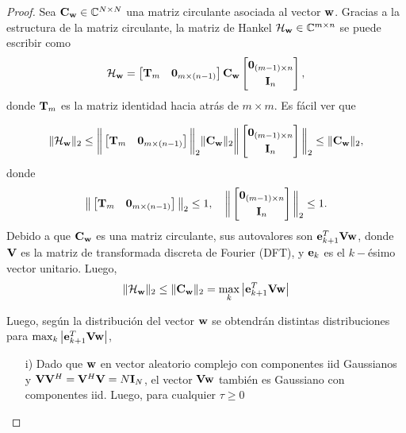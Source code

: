	\begin{proof}  Sea $\mathbf{C}_{\mathbf{w}}\in\mathbb{C}^{N\times N}$ una matriz circulante asociada al vector $\mathbf{w}$. Gracias a la estructura de la matriz circulante, la matriz de Hankel $\mathcal{H}_{\mathbf{w}}\in\mathbb{C}^{m\times n}$ se puede escribir como
		\[\mathcal{H}_{\mathbf{w}} = \begin{bmatrix}\mathbf{T}_m & \mathbf{0}_{m\times(n-1)}\end{bmatrix}\mathbf{C}_{\mathbf{w}}\begin{bmatrix}\mathbf{0}_{(m-1)\times n}\\[0.3em] \mathbf{I}_n
		\end{bmatrix},\]
		donde $\mathbf{T}_m$ es la matriz identidad hacia atrás de $m\times m$. Es fácil ver que
		
		\[\|\mathcal{H}_{\mathbf{w}}\|_2\le \bigg\|\begin{bmatrix}\mathbf{T}_m & \mathbf{0}_{m\times(n-1)}\end{bmatrix}\bigg\|_2\|\mathbf{C}_{\mathbf{w}}\|_2\bigg\|\begin{bmatrix}\mathbf{0}_{(m-1)\times n}\\[0.3em] \mathbf{I}_n
		\end{bmatrix}\bigg\|_2 \le \|\mathbf{C}_{\mathbf{w}}\|_2,\]
		donde 
		\[\big\|\begin{bmatrix}\mathbf{T}_m & \mathbf{0}_{m\times(n-1)}\end{bmatrix}\big\|_2\le 1,\quad \bigg\|\begin{bmatrix}\mathbf{0}_{(m-1)\times n}\\[0.3em] \mathbf{I}_n
		\end{bmatrix}\bigg\|_2\le 1.\]
		Debido a que $\mathbf{C}_{\mathbf{w}}$ es una matriz circulante, sus autovalores son $\mathbf{e}^T_{k+1}\mathbf{V}\mathbf{w}$, donde $\mathbf{V}$ es la matriz de transformada discreta de Fourier (DFT), y $\mathbf{e}_k$ es el $k-$ésimo vector unitario. Luego,
		\[\|\mathcal{H}_{\mathbf{w}}\|_2\le\|\mathbf{C}_{\mathbf{w}}\|_2 = \max_k \big|\mathbf{e}^T_{k+1}\mathbf{V}\mathbf{w}\big|\]
		
		Luego, según la distribución del vector $\mathbf{w}$ se obtendrán distintas distribuciones para $\max_k \big|\mathbf{e}^T_{k+1}\mathbf{V}\mathbf{w}\big|$,
		\begin{itemize}
			\item[i)]
			Dado que $\mathbf{w}$ en vector aleatorio complejo con componentes iid Gaussianos y $\mathbf{V}\mathbf{V}^H = \mathbf{V}^H\mathbf{V} = N\mathbf{I}_{N}$, el vector $\mathbf{V}\mathbf{w}$ también es Gaussiano con componentes iid. Luego, para cualquier $\tau\ge0$
			

\end{itemize}
\end{proof}
